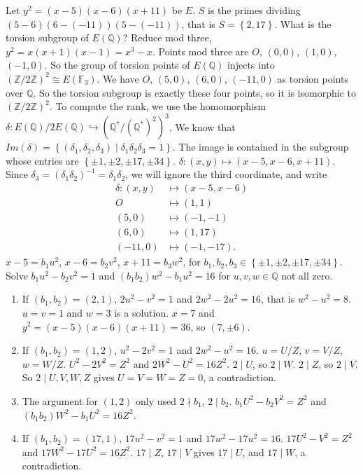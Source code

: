 \documentclass{article}
\newcommand{\F}{\mathbb{F}}
\newcommand{\Z}{\mathbb{Z}}
\newcommand{\Q}{\mathbb{Q}}
\newcommand{\rb}[1]{\left( #1 \right)}
\newcommand{\cb}[1]{\left\{ #1 \right\}}
\theoremstyle{definition}\newtheorem{definition}{Definition}[section]
\theoremstyle{definition}\newtheorem{remark}[definition]{Remark}
\theoremstyle{definition}\newtheorem*{example}{Example}
\theoremstyle{definition}\newtheorem*{note}{Note}
\begin{document}
Let $ y^2 = \rb{x - 5}\rb{x - 6}\rb{x + 11} $ be $ E $. $ S $ is the primes dividing $ \rb{5 - 6}\rb{6 - \rb{-11}}\rb{5 - \rb{-11}} $, that is $ S = \cb{2, 17} $. What is the torsion subgroup of $ E\rb{\Q} $? Reduce mod three, $ y^2 = x\rb{x + 1}\rb{x - 1} = x^3 - x $. Points mod three are $ O $, $ \rb{0, 0} $, $ \rb{1, 0} $, $ \rb{-1, 0} $. So the group of torsion points of $ E\rb{\Q} $ injects into $ \rb{\Z / 2\Z}^2 \cong E\rb{\F_3} $. We have $ O $, $ \rb{5, 0} $, $ \rb{6, 0} $, $ \rb{-11, 0} $ as torsion points over $ \Q $. So the torsion subgroup is exactly these four points, so it is isomorphic to $ \rb{\Z / 2\Z}^2 $. To compute the rank, we use the homomorphism $ \delta : E\rb{\Q} / 2E\rb{\Q} \hookrightarrow \rb{\Q^* / \rb{\Q^*}^2}^3 $. We know that $ Im\rb{\delta} = \cb{\rb{\delta_1, \delta_2, \delta_3} \mid \delta_1\delta_2\delta_3 = 1} $. The image is contained in the subgroup whose entries are $ \cb{\pm 1, \pm 2, \pm 17, \pm 34} $. $ \delta : \rb{x, y} \mapsto \rb{x - 5, x - 6, x + 11} $. Since $ \delta_3 = \rb{\delta_1\delta_2}^{-1} = \delta_1\delta_2 $, we will ignore the third coordinate, and write
\begin{align*}
\delta : \rb{x, y} & \mapsto \rb{x - 5, x - 6} \\
O & \mapsto \rb{1, 1} \\
\rb{5, 0} & \mapsto \rb{-1, -1} \\
\rb{6, 0} & \mapsto \rb{1, 17} \\
\rb{-11, 0} & \mapsto \rb{-1, -17}.
\end{align*}
$ x - 5 = b_1u^2 $, $ x - 6 = b_2v^2 $, $ x + 11 = b_3w^2 $, for $ b_1, b_2, b_3 \in \cb{\pm 1, \pm 2, \pm 17, \pm 34} $. Solve $ b_1u^2 - b_2v^2 = 1 $ and $ \rb{b_1b_2}w^2 - b_1u^2 = 16 $ for $ u, v, w \in \Q $ not all zero.
\begin{enumerate}
\item If $ \rb{b_1, b_2} = \rb{2, 1} $, $ 2u^2 - v^2 = 1 $ and $ 2w^2 - 2u^2 = 16 $, that is $ w^2 - u^2 = 8 $. $ u = v = 1 $ and $ w = 3 $ is a solution. $ x = 7 $ and $ y^2 = \rb{x - 5}\rb{x - 6}\rb{x + 11} = 36 $, so $ \rb{7, \pm 6} $.
\item If $ \rb{b_1, b_2} = \rb{1, 2} $, $ u^2 - 2v^2 = 1 $ and $ 2w^2 - u^2 = 16 $. $ u = U / Z $, $ v = V / Z $, $ w = W / Z $. $ U^2 - 2V^2 = Z^2 $ and $ 2W^2 - U^2 = 16Z^2 $. $ 2 \mid U $, so $ 2 \mid W $. $ 2 \mid Z $, so $ 2 \mid V $. So $ 2 \mid U, V, W, Z $ gives $ U = V = W = Z = 0 $, a contradiction.
\item The argument for $ \rb{1, 2} $ only used $ 2 \nmid b_1 $, $ 2 \mid b_2 $. $ b_1U^2 - b_2V^2 = Z^2 $ and $ \rb{b_1b_2}W^2 - b_1U^2 = 16Z^2 $.
\item If $ \rb{b_1, b_2} = \rb{17, 1} $, $ 17u^2 - v^2 = 1 $ and $ 17w^2 - 17u^2 = 16 $. $ 17U^2 - V^2 = Z^2 $ and $ 17W^2 - 17U^2 = 16Z^2 $. $ 17 \mid Z $, $ 17 \mid V $ gives $ 17 \mid U $, and $ 17 \mid W $, a contradiction.
\end{enumerate}
\end{document}
